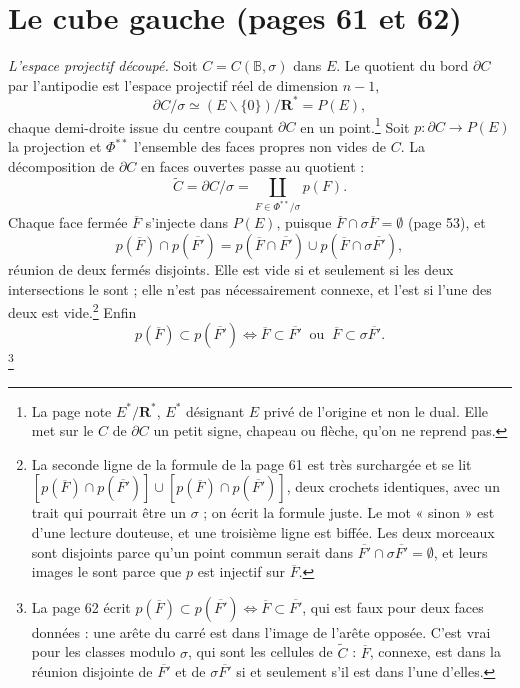 \documentclass[11pt,a4paper]{article}
\begin{document}
\section*{Le cube gauche (pages 61 et 62)}

\emph{L'espace projectif découpé.} Soit $C = C(\mathbb{B}, \sigma)$ dans $E$.
Le quotient du bord $\partial C$ par l'antipodie est l'espace projectif réel
de dimension $n - 1$,
\[
  \partial C/\sigma \simeq (E \smallsetminus \{0\})/\mathbf{R}^* = P(E) ,
\]
chaque demi-droite issue du centre coupant $\partial C$ en un
point.\footnote{La page note $E^*/\mathbf{R}^*$, $E^*$ désignant $E$ privé de
l'origine et non le dual. Elle met sur le $C$ de $\partial C$ un petit signe,
chapeau ou flèche, qu'on ne reprend pas.} Soit $p : \partial C \to P(E)$ la
projection et $\Phi^{**}$ l'ensemble des faces propres non vides de $C$. La
décomposition de $\partial C$ en faces ouvertes passe au quotient :
\[
  \widetilde{C} = \partial C/\sigma = \coprod_{F \in \Phi^{**}/\sigma} p(F) .
\]
Chaque face fermée $\overline{F}$ s'injecte dans $P(E)$, puisque $\overline{F}
\cap \sigma\overline{F} = \emptyset$ (page 53), et
\[
  p(\overline{F}) \cap p(\overline{F'}) = p(\overline{F} \cap \overline{F'})
  \cup p(\overline{F} \cap \sigma\overline{F'}) ,
\]
réunion de deux fermés disjoints. Elle est vide si et seulement si les deux
intersections le sont ; elle n'est pas nécessairement connexe, et l'est si
l'une des deux est vide.\footnote{La seconde ligne de la formule de la page
61 est très surchargée et se lit $[p(\overline{F}) \cap p(\overline{F'})] \cup
[p(\overline{F}) \cap p(\overline{F'})]$, deux crochets identiques, avec un
trait qui pourrait être un $\sigma$ ; on écrit la formule juste. Le mot
« sinon » est d'une lecture douteuse, et une troisième ligne est biffée. Les
deux morceaux sont disjoints parce qu'un point commun serait dans $\overline{F'}
\cap \sigma\overline{F'} = \emptyset$, et leurs images le sont parce que $p$
est injectif sur $\overline{F}$.} Enfin
\[
  p(\overline{F}) \subset p(\overline{F'}) \iff \overline{F} \subset
  \overline{F'} \ \text{ ou } \ \overline{F} \subset \sigma\overline{F'} .
\]
\footnote{La page 62 écrit $p(\overline{F}) \subset p(\overline{F'}) \iff
\overline{F} \subset \overline{F'}$, qui est faux pour deux faces données :
une arête du carré est dans l'image de l'arête opposée. C'est vrai pour les
classes modulo $\sigma$, qui sont les cellules de $\widetilde{C}$ : $\overline{F}$,
connexe, est dans la réunion disjointe de $\overline{F'}$ et de
$\sigma\overline{F'}$ si et seulement s'il est dans l'une d'elles.}
\end{document}
